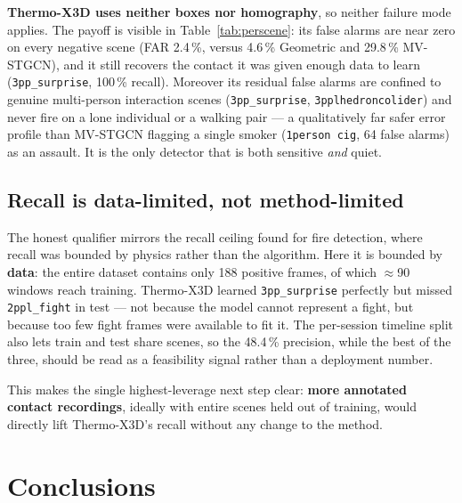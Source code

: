 \documentclass[11pt, a4paper]{article}
\begin{document}
\textbf{Thermo-X3D uses neither boxes nor homography}, so neither failure mode
applies. The payoff is visible in Table~\ref{tab:perscene}: its false alarms are
near zero on every negative scene (FAR 2.4\,\%, versus 4.6\,\% Geometric and
29.8\,\% MV-STGCN), and it still recovers the contact it was given enough data
to learn (\texttt{3pp\_surprise}, 100\,\% recall). Moreover its residual false
alarms are confined to genuine multi-person interaction scenes
(\texttt{3pp\_surprise}, \texttt{3pplhedroncolider}) and never fire on a lone
individual or a walking pair --- a qualitatively far safer error profile than
MV-STGCN flagging a single smoker (\texttt{1person cig}, 64 false alarms) as an
assault. It is the only detector that is both sensitive \emph{and} quiet.

\subsection{Recall is data-limited, not method-limited}
The honest qualifier mirrors the recall ceiling found for fire detection, where
recall was bounded by physics rather than the algorithm. Here it is bounded by
\textbf{data}: the entire dataset contains only 188 positive frames, of which
$\approx$90 windows reach training. Thermo-X3D learned \texttt{3pp\_surprise}
perfectly but missed \texttt{2ppl\_fight} in test --- not because the model
cannot represent a fight, but because too few fight frames were available to fit
it. The per-session timeline split also lets train and test share scenes, so the
48.4\,\% precision, while the best of the three, should be read as a feasibility
signal rather than a deployment number.

This makes the single highest-leverage next step clear: \textbf{more annotated
contact recordings}, ideally with entire scenes held out of training, would
directly lift Thermo-X3D's recall without any change to the method.

\section{Conclusions}
\end{document}
